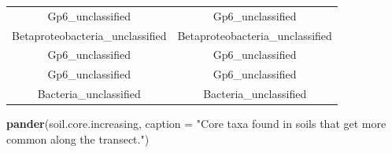 \documentclass[]{article}
\newenvironment{Shaded}{\begin{snugshade}}{\end{snugshade}}
\newcommand{\KeywordTok}[1]{\textcolor[rgb]{0.13,0.29,0.53}{\textbf{#1}}}
\newcommand{\DataTypeTok}[1]{\textcolor[rgb]{0.13,0.29,0.53}{#1}}
\newcommand{\StringTok}[1]{\textcolor[rgb]{0.31,0.60,0.02}{#1}}
\newcommand{\NormalTok}[1]{#1}
\begin{document}
\begin{longtable}[]{@{}cc@{}}
\begin{minipage}[t]{0.44\columnwidth}
Gp6\_unclassified\strut
\end{minipage} & \begin{minipage}[t]{0.44\columnwidth}\centering\strut
Gp6\_unclassified\strut
\end{minipage}\tabularnewline
\begin{minipage}[t]{0.44\columnwidth}\centering\strut
Betaproteobacteria\_unclassified\strut
\end{minipage} & \begin{minipage}[t]{0.44\columnwidth}\centering\strut
Betaproteobacteria\_unclassified\strut
\end{minipage}\tabularnewline
\begin{minipage}[t]{0.44\columnwidth}\centering\strut
Gp6\_unclassified\strut
\end{minipage} & \begin{minipage}[t]{0.44\columnwidth}\centering\strut
Gp6\_unclassified\strut
\end{minipage}\tabularnewline
\begin{minipage}[t]{0.44\columnwidth}\centering\strut
Gp6\_unclassified\strut
\end{minipage} & \begin{minipage}[t]{0.44\columnwidth}\centering\strut
Gp6\_unclassified\strut
\end{minipage}\tabularnewline
\begin{minipage}[t]{0.44\columnwidth}\centering\strut
Bacteria\_unclassified\strut
\end{minipage} & \begin{minipage}[t]{0.44\columnwidth}\centering\strut
Bacteria\_unclassified\strut
\end{minipage}\tabularnewline
\bottomrule
\end{longtable}

\begin{Shaded}
\begin{Highlighting}[]
\KeywordTok{pander}\NormalTok{(soil.core.increasing, }\DataTypeTok{caption =} \StringTok{"Core taxa found in soils that get more common along the transect."}\NormalTok{)}
\end{Highlighting}
\end{Shaded}
\end{document}
